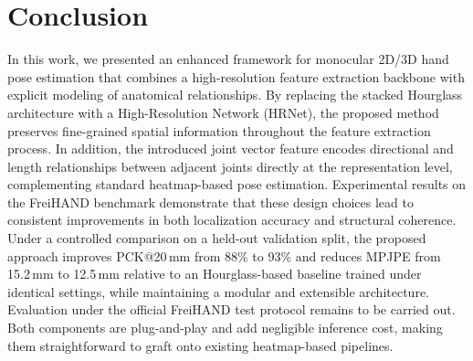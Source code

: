 \section{Conclusion}
In this work, we presented an enhanced framework for monocular 2D/3D hand pose estimation that combines a high-resolution feature extraction backbone with explicit modeling of anatomical relationships. By replacing the stacked Hourglass architecture with a High-Resolution Network (HRNet), the proposed method preserves fine-grained spatial information throughout the feature extraction process. In addition, the introduced joint vector feature encodes directional and length relationships between adjacent joints directly at the representation level, complementing standard heatmap-based pose estimation.
Experimental results on the FreiHAND benchmark demonstrate that these design choices lead to consistent improvements in both localization accuracy and structural coherence. Under a controlled comparison on a held-out validation split, the proposed approach improves PCK@20\,mm from 88\% to 93\% and reduces MPJPE from 15.2\,mm to 12.5\,mm relative to an Hourglass-based baseline trained under identical settings, while maintaining a modular and extensible architecture. Evaluation under the official FreiHAND test protocol remains to be carried out.
Both components are plug-and-play and add negligible inference cost, making them straightforward to graft onto existing heatmap-based pipelines.



